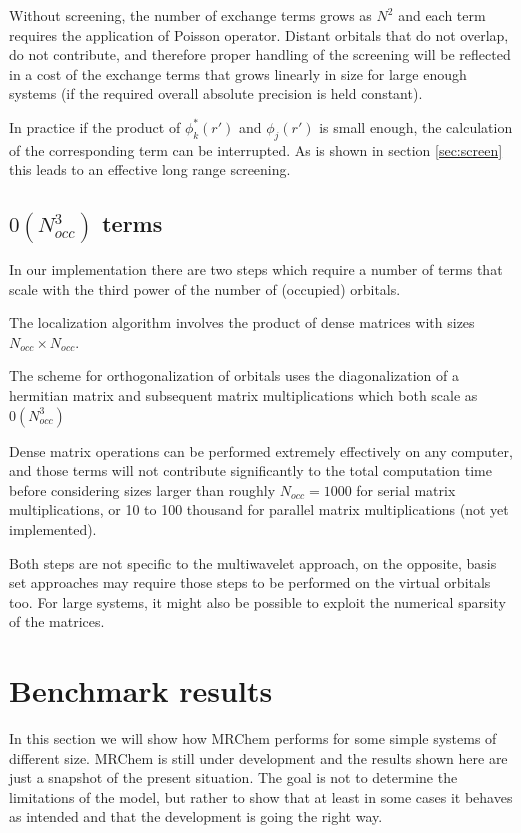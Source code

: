 \documentclass[%
 aip,
 amsmath,amssymb,
 reprint,%
]{revtex4-1}
\begin{document}
Without screening, the number of exchange terms grows as $N^2$ and each term requires the application of Poisson operator. Distant orbitals that do not overlap, do not contribute, and therefore proper handling of the screening will be reflected in a cost of the exchange terms that grows linearly in size for large enough systems (if the required overall absolute precision is held constant). 

In practice if the product of $\phi^*_k(r')$ and $\phi_j(r')$ is small enough, the calculation of the corresponding term can be interrupted. As is shown in section \ref{sec:screen} this leads to an effective long range screening.


\subsection{$0(N_{occ}^3)$ terms}

In our implementation there are two steps which require a number of terms that scale with the third power of the number of (occupied) orbitals. 

The localization algorithm involves the product of dense matrices with sizes $N_{occ} \times N_{occ}$. 

The scheme for orthogonalization of orbitals uses the diagonalization of a hermitian matrix and subsequent matrix multiplications which both scale as $0(N_{occ}^3)$

Dense matrix operations can be performed extremely effectively on any computer, and those terms will not contribute significantly to the total computation time before considering sizes larger than roughly $N_{occ}=1000$ for serial matrix multiplications, or 10 to 100 thousand for parallel matrix multiplications (not yet implemented). 

Both steps are not specific to the multiwavelet approach, on the opposite, basis set approaches may require those steps to be performed on the virtual orbitals too. For large systems, it might also be possible to exploit the numerical sparsity of the matrices.


\section{Benchmark results}
In this section we will show how MRChem performs for some simple systems of different size. MRChem is still under development and the results shown here are just a snapshot of the present situation. The goal is not to determine the limitations of the model, but rather to show that at least in some cases it behaves as intended and that the development is going the right way.
\end{document}
